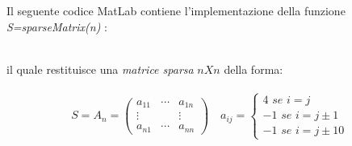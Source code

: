 Il seguente codice MatLab contiene l'implementazione della funzione \textit{S=sparseMatrix(n)} :\\\
	
il quale restituisce una \textit{matrice sparsa} $nXn$ della forma:\\\
	\[
		S=A_n=\begin{pmatrix}
			a_{11} & \cdots & a_{1n} \\
			\vdots &		& \vdots \\
			a_{n1} & \cdots & a_{nn} 
		\end{pmatrix}
	\quad
		a_{ij}=\begin{cases}
				 4 \textit{ se } i=j \\ -1 \textit{  se } i=j\pm1 \\  -1 \textit{  se } i=j\pm10
				\end{cases}
	\]